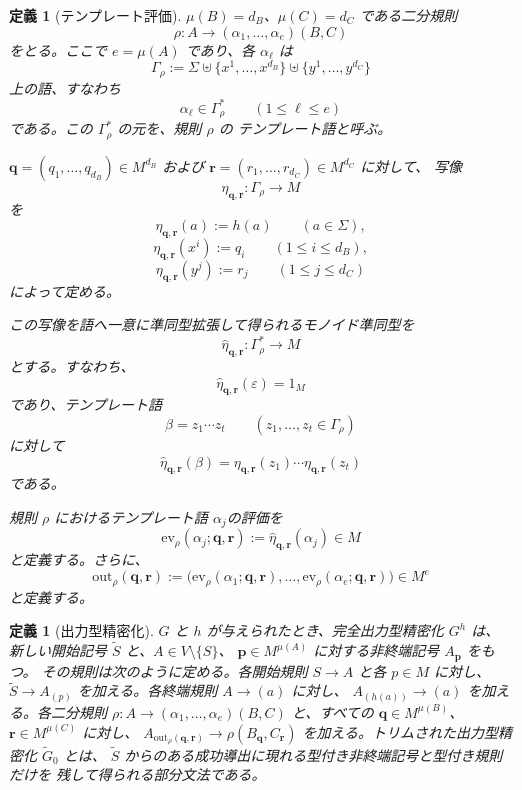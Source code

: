 \documentclass[11pt,a4paper]{ltjsarticle}
\newtheorem{definition}[theorem]{定義}
\theoremstyle{remark}
\newcommand{\out}{\mathrm{out}}
\newcommand{\ev}{\mathrm{ev}}
\newcommand{\eps}{\varepsilon}
\begin{document}
\begin{definition}[テンプレート評価]
\label{def:output-map}
\(\mu(B)=d_B\)、\(\mu(C)=d_C\) である二分規則
\[
  \rho\colon
  A\to(\alpha_1,\ldots,\alpha_e)(B,C)
\]
をとる。ここで \(e=\mu(A)\) であり、各 \(\alpha_\ell\) は
\[
  \Gamma_\rho
  :=
  \Sigma
  \uplus
  \{x^1,\ldots,x^{d_B}\}
  \uplus
  \{y^1,\ldots,y^{d_C}\}
\]
上の語、すなわち
\[
  \alpha_\ell\in\Gamma_\rho^*
  \qquad (1\le \ell\le e)
\]
である。この \(\Gamma_\rho^*\) の元を、規則 \(\rho\) の
\emph{テンプレート語}と呼ぶ。

\(\mathbf q=(q_1,\ldots,q_{d_B})\in M^{d_B}\) および
\(\mathbf r=(r_1,\ldots,r_{d_C})\in M^{d_C}\) に対して、
写像
\[
  \eta_{\mathbf q,\mathbf r}\colon\Gamma_\rho\to M
\]
を
\[
  \eta_{\mathbf q,\mathbf r}(a):=h(a)
  \qquad (a\in\Sigma),
\]
\[
  \eta_{\mathbf q,\mathbf r}(x^i):=q_i
  \qquad (1\le i\le d_B),
\]
\[
  \eta_{\mathbf q,\mathbf r}(y^j):=r_j
  \qquad (1\le j\le d_C)
\]
によって定める。

この写像を語へ一意に準同型拡張して得られるモノイド準同型を
\[
  \widehat{\eta}_{\mathbf q,\mathbf r}
  \colon
  \Gamma_\rho^*\to M
\]
とする。すなわち、
\[
  \widehat{\eta}_{\mathbf q,\mathbf r}(\eps)=1_M
\]
であり、テンプレート語
\[
  \beta=z_1\cdots z_t
  \qquad (z_1,\ldots,z_t\in\Gamma_\rho)
\]
に対して
\[
  \widehat{\eta}_{\mathbf q,\mathbf r}(\beta)
  =
  \eta_{\mathbf q,\mathbf r}(z_1)
  \cdots
  \eta_{\mathbf q,\mathbf r}(z_t)
\]
である。

規則 \(\rho\) におけるテンプレート語 $\alpha_j$の評価を
\[
  \ev_\rho(\alpha_j;\mathbf q,\mathbf r)
  :=
  \widehat{\eta}_{\mathbf q,\mathbf r}(\alpha_j)
  \in M
\]
と定義する。さらに、
\[
  \out_\rho(\mathbf q,\mathbf r)
  :=
  \bigl(
    \ev_\rho(\alpha_1;\mathbf q,\mathbf r),
    \ldots,
    \ev_\rho(\alpha_e;\mathbf q,\mathbf r)
  \bigr)
  \in M^e
\]
と定義する。
\end{definition}

\begin{definition}[出力型精密化]
\label{def:output-refinement}
\(G\) と \(h\) が与えられたとき、完全出力型精密化 \(G^h\) は、新しい開始記号
\(\widetilde S\) と、\(A\in V\setminus\{S\}\)、
\(\mathbf p\in M^{\mu(A)}\) に対する非終端記号 \(A_{\mathbf p}\) をもつ。
その規則は次のように定める。各開始規則 \(S\to A\) と各 \(p\in M\) に対し、
\(\widetilde S\to A_{(p)}\) を加える。各終端規則 \(A\to(a)\) に対し、
\(A_{(h(a))}\to(a)\) を加える。各二分規則
\(\rho\colon A\to(\alpha_1,\ldots,\alpha_e)(B,C)\) と、すべての
\(\mathbf q\in M^{\mu(B)}\)、\(\mathbf r\in M^{\mu(C)}\) に対し、
\(A_{\out_\rho(\mathbf q,\mathbf r)}\to\rho(B_{\mathbf q},C_{\mathbf r})\)
を加える。トリムされた出力型精密化 \(\widetilde G_0\) とは、
\(\widetilde S\) からのある成功導出に現れる型付き非終端記号と型付き規則だけを
残して得られる部分文法である。
\end{definition}
\end{document}

